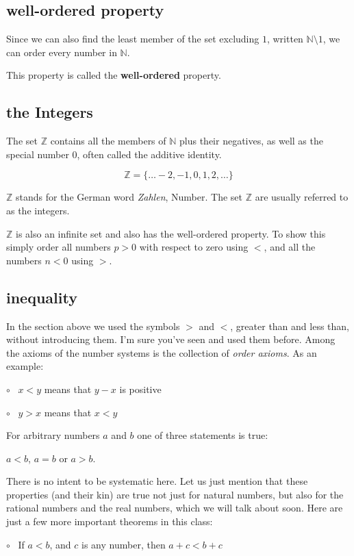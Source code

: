 \documentclass[11pt, oneside]{article}
\begin{document}
\subsection*{well-ordered property}

Since we can also find the least member of the set excluding $1$, written $\mathbb{N} \setminus 1$, we can order every number in $\mathbb{N}$.  

This property is called the \textbf{well-ordered} property.

\subsection*{the Integers}

The set $\mathbb{Z}$ contains all the members of $\mathbb{N}$ plus their negatives, as well as the special number $0$, often called the additive identity.

\[ \mathbb{Z} = \{ \dots -2, -1, 0, 1, 2, \dots \} \]

$\mathbb{Z}$ stands for the German word \emph{Zahlen}, Number.  The set $\mathbb{Z}$ are usually referred to as the integers.

$\mathbb{Z}$ is also an infinite set and also has the well-ordered property.  To show this simply order all numbers $p > 0$ with respect to zero using $<$, and all the numbers $n < 0$ using $>$.

\subsection*{inequality}
In the section above we used the symbols $>$ and $<$, greater than and less than, without introducing them.  I'm sure you've seen and used them before.  Among the axioms of the number systems is the collection of \emph{order axioms}.  As an example:

$\circ$ \ $x < y$ means that $y - x$ is positive

$\circ$ \ $y > x$ means that $x < y$

For arbitrary numbers $a$ and $b$ one of three statements is true:  

$a < b$, $a = b$ or $a > b$.

There is no intent to be systematic here.  Let us just mention that these properties (and their kin) are true not just for natural numbers, but also for the rational numbers and the real numbers, which we will talk about soon.  Here are just a few more important theorems in this class:

$\circ$ \ If $a < b$, and $c$ is any number, then $a + c < b + c$
\end{document}
